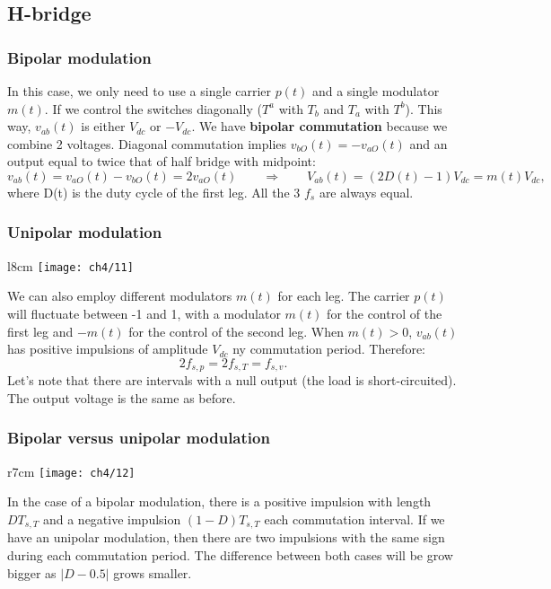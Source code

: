 	\subsection{H-bridge}
		\subsubsection{Bipolar modulation}
		    In this case, we only need to use a single carrier $p(t)$ and a single modulator $m(t)$. If we control the switches diagonally ($T^a$ with $T_b$ and $T_a$ with $T^b$). This way, $v_{ab}(t)$ is either $V_{dc}$ or $-V_{dc}$. We have \textbf{bipolar commutation} because we combine 2 voltages. Diagonal commutation implies $v_{bO}(t) = - v_{aO}(t)$ and an output equal to twice that of half bridge with midpoint:
			\begin{equation}
				v_{ab}(t) = v_{aO}(t)-v_{bO}(t) = 2v_{aO}(t) \qquad \Rightarrow \qquad V_{ab}(t) = (2D(t)-1)V_{dc} = m(t) V_{dc},
			\end{equation}
			where D(t) is the duty cycle of the first leg. All the 3 $f_s$ are always equal.
			
		\subsubsection{Unipolar modulation}
			\begin{wrapfigure}[14]{l}{8cm}
			\vspace{-5mm}
			\texttt{[image: ch4/11]}
			\end{wrapfigure}
			We can also employ different modulators $m(t)$ for each leg. The carrier $p(t)$ will fluctuate between -1 and 1, with a modulator $m(t)$ for the control of the first leg and $-m(t)$ for the control of the second leg. When $m(t) > 0$, $v_{ab}(t)$ has positive impulsions of amplitude $V_{dc}$ ny commutation period. Therefore:
			\begin{equation}
				2 f_{s,p} = 2f_{s,T} = f_{s,v}.
			\end{equation}
			Let's note that there are intervals with a null output (the load is short-circuited). The output voltage is the same as before. \\
			
		\subsubsection{Bipolar versus unipolar modulation}
			\begin{wrapfigure}[8]{r}{7cm}
			\vspace{-5mm}
			\texttt{[image: ch4/12]}
			\end{wrapfigure}
			In the case of a bipolar modulation, there is a positive impulsion with length $DT_{s,T}$ and a negative impulsion $(1-D)T_{s,T}$ each commutation interval. If we have an unipolar modulation, then there are two impulsions with the same sign during each commutation period. The difference between both cases will be grow bigger as $|D-0.5|$ grows smaller.
			\newpage
			
